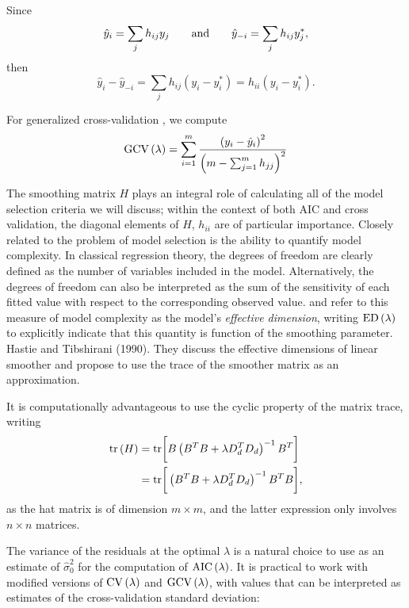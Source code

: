 \documentclass[12pt]{article}
\theoremstyle{definition}
\begin{document}
 Since 
 \[
 \hat{y}_i = \sum_{j} h_{ij} y_j \qquad \textup{and} \qquad \hat{y}_{-i} = \sum_{j} h_{ij} y_j^*,
 \]
 \noindent
 then
 \[
 \hat{y}_i - \hat{y}_{-i} = \sum_j h_{ij} \left(y_i - y_i^*\right) = h_{ii} \left(y_i - y_i^*\right).  
\]


For generalized cross-validation \cite{wahba1990spline}, we compute 
\begin{equation} \label{eq:univariate_GCV}
\textup{GCV}\left(\lambda\right) = \sum_{i=1}^m \frac{\left(  y_i - \hat{y}_i \right)^2}{\left(m-\sum_{j=1}^m h_{jj}\right)^2} 
\end{equation}

The smoothing matrix $H$ plays an integral role of calculating all of the model selection criteria we will discuss; within the context of both AIC and cross validation, the diagonal elements of $H$, $h_{ii}$ are of particular importance. Closely related to the problem of model selection is the ability to quantify model complexity. In classical regression theory, the degrees of freedom are clearly defined as the number of variables included in the model. Alternatively, the degrees of freedom can also be interpreted as the sum of the sensitivity of each fitted value with respect to the corresponding observed value. \cite{eilers1996flexible} and\cite{marx2005multidimensional} refer to this measure of model complexity as the model's \emph{effective dimension}, writing $\textup{ED}\left(\lambda\right)$ to explicitly indicate that this quantity is function of the smoothing parameter. 
Hastie and Tibshirani (1990). They discuss the effective dimensions of linear smoother and propose to use the trace of the smoother matrix as an approximation. 

It is computationally advantageous to use the cyclic property of the matrix trace, writing 
\begin{align*}
\textup{tr}\left(H\right) &= \textup{tr}\bigg[ B\left(B^TB + \lambda D_d^T D_d \right)^{-1} B^T\bigg]\\
&=\textup{tr}\bigg[ \left(B^TB + \lambda D_d^T D_d \right)^{-1} B^TB\bigg],
\end{align*}
as the hat matrix is of dimension $m \times m$, and the latter expression only involves $n \times n$ matrices.


The variance of the residuals at the optimal $\lambda$ is a natural choice to use as an estimate of $\hat{\sigma}_0^2$ for the computation of $\textup{AIC}\left(\lambda\right)$. It is practical to work with modified versions of $\textup{CV}\left(\lambda\right)$ and $\textup{GCV}\left(\lambda\right)$, with values that can be interpreted as estimates of the cross-validation standard deviation:
\end{document}
